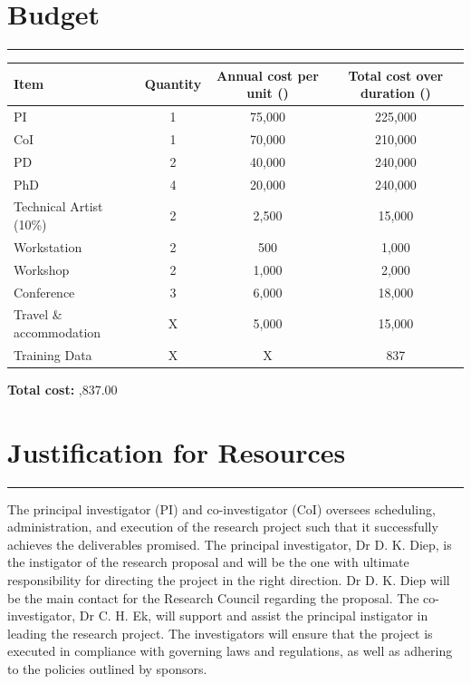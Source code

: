 \documentclass[a4paper, 11pt, onecolumn]{article} %
\numberwithin{equation}{section} %
\numberwithin{figure}{section} %
\numberwithin{table}{section} %
\begin{document}



\newpage

\section*{Budget}
\hrule\vspace{0.5em}

\begin{table}[!h]
	\centering
	{\renewcommand{\arraystretch}{1.8} %
	\begin{tabular}{|l|c|c|c|}
		\hline
		Item		& Quantity	& Annual cost per unit (\textsterling)	& Total cost over duration (\textsterling)\\
		\hline
		PI			& 1			& 75,000				& 225,000\\
		\hline
		CoI			& 1			& 70,000				& 210,000\\
		\hline
		PD			& 2			& 40,000				& 240,000\\
		\hline
		PhD			& 4			& 20,000				& 240,000\\
		\hline
		Technical Artist (10\%) & 2 & 2,500				& 15,000\\
		\hline
		Workstation	& 2			& 500					& 1,000\\		
		\hline
		Workshop	& 2			& 1,000					& 2,000\\		
		\hline
		Conference	& 3			& 6,000					& 18,000\\		
		\hline
		Travel \& accommodation & X	& 5,000				& 15,000\\		
		\hline
		Training Data& X		& X						& 837\\
		\hline
	\end{tabular}
	}
\end{table}

\vspace{1cm}

\textbf{Total cost:} ,837.00

\newpage

\section*{Justification for Resources}
\hrule\vspace{0.5em}

The principal investigator (PI) and co-investigator (CoI) oversees scheduling, administration, and execution of the research project such that it successfully achieves the deliverables promised.
The principal investigator, Dr D. K. Diep, is the instigator of the research proposal and will be the one with ultimate responsibility for directing the project in the right direction. Dr D. K. Diep will be the main contact for the Research Council regarding the proposal.
The co-investigator, Dr C. H. Ek, will support and assist the principal instigator in leading the research project.
The investigators will ensure that the project is executed in compliance with governing laws and regulations, as well as adhering to the policies outlined by sponsors.
\end{document}
